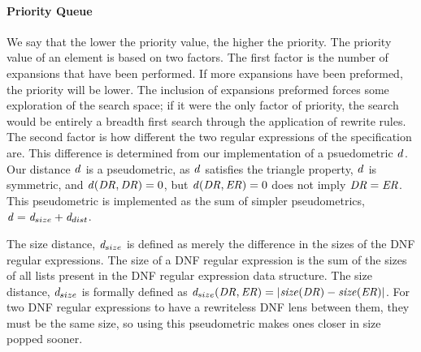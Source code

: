 \documentclass[numbers,10pt,preprint\ifanon ,nocopyrightspace\fi]{sigplanconf}
\begin{document}
\paragraph*{Priority Queue}
We say that the lower the priority value, the higher the priority.
The priority value of an element is based on two factors.  The first factor is
the number of expansions that have been performed.  If more expansions have been
preformed, the priority will be lower.  The inclusion of expansions preformed
forces some exploration of the
search space; if it were the only factor of priority, the search would be
entirely a breadth first search through the application of rewrite rules.
The second factor is how different the two regular expressions of the
specification are.  This difference is determined from our implementation of
a psuedometric $\mathit{d}$.  Our distance $\mathit{d}$ is
a pseudometric, as $\mathit{d}$ satisfies the triangle property, $\mathit{d}$ is
symmetric, and $\mathit{d}(\mathit{DR},\mathit{DR}) = 0$, but
$\mathit{d}(\mathit{DR},\mathit{ER}) = 0$ does not imply $\mathit{DR} =
\mathit{ER}$.  This pseudometric is implemented
as the sum of simpler pseudometrics,
$\mathit{d} = \mathit{d}_{size}+\mathit{d}_{dist}$.

The size distance, $\mathit{d}_{size}$ is defined as merely the difference in the
sizes of the DNF
regular expressions.  The size of a DNF regular expression is the sum of the
sizes of all lists present in the DNF regular expression data structure.
The size distance, $\mathit{d}_{size}$ is formally defined as
$\mathit{d}_{size}(\mathit{DR},\mathit{ER})=|\mathit{size}(\mathit{DR})-\mathit{size}(\mathit{ER})|$.
For two DNF regular expressions to have a rewriteless DNF lens between
them, they must be the same size, so using this pseudometric makes ones closer
in size popped sooner.
\end{document}
